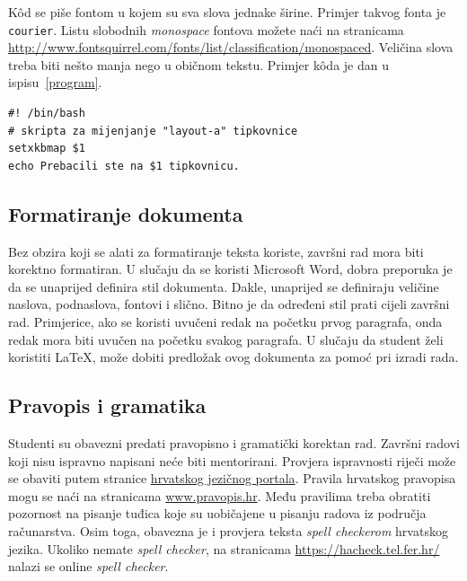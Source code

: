 K\^od se piše fontom u kojem su sva slova jednake širine. Primjer takvog fonta je \texttt{courier}. Listu slobodnih \textit{monospace} fontova možete naći na stranicama \url{http://www.fontsquirrel.com/fonts/list/classification/monospaced}. 
Veličina slova treba biti nešto manja nego u običnom tekstu. Primjer k\^oda je dan u ispisu~\ref{program}.
%

\begin{lstlisting}[caption={Skripta za mijenjanje rasporeda tipki tipkovnice}, label=program]
#! /bin/bash
# skripta za mijenjanje "layout-a" tipkovnice
setxkbmap $1
echo Prebacili ste na $1 tipkovnicu.
\end{lstlisting}



\subsection{Formatiranje dokumenta}

Bez obzira koji se alati za formatiranje teksta koriste, završni rad mora biti korektno formatiran. U slučaju da se koristi Microsoft Word, 
dobra preporuka je da se unaprijed definira 
stil dokumenta. Dakle, unaprijed se definiraju veličine naslova, podnaslova, fontovi i slično. Bitno je da određeni stil prati cijeli završni rad. 
Primjerice, ako se koristi 
uvučeni redak na početku prvog paragrafa, onda redak mora biti uvučen na početku svakog paragrafa.
U slučaju da student želi koristiti \LaTeX, može dobiti predložak ovog dokumenta za pomoć pri izradi rada.
\subsection{Pravopis i gramatika}

Studenti su obavezni predati pravopisno i gramatički korektan rad. Završni radovi koji nisu ispravno napisani neće biti mentorirani. Provjera ispravnosti riječi može se obaviti putem stranice \href{http://hjp.novi-liber.hr/}{hrvatskog jezičnog portala}. Pravila hrvatskog pravopisa mogu se naći na stranicama \href{www.pravopis.hr}{www.pravopis.hr}. Među pravilima treba obratiti pozornost na pisanje tuđica koje su uobičajene u pisanju radova iz područja računarstva. Osim toga, obavezna je i provjera teksta \textit{spell checkerom} hrvatskog jezika. Ukoliko nemate \textit{spell checker}, na stranicama \url{https://hacheck.tel.fer.hr/} nalazi se online \textit{spell checker}.
